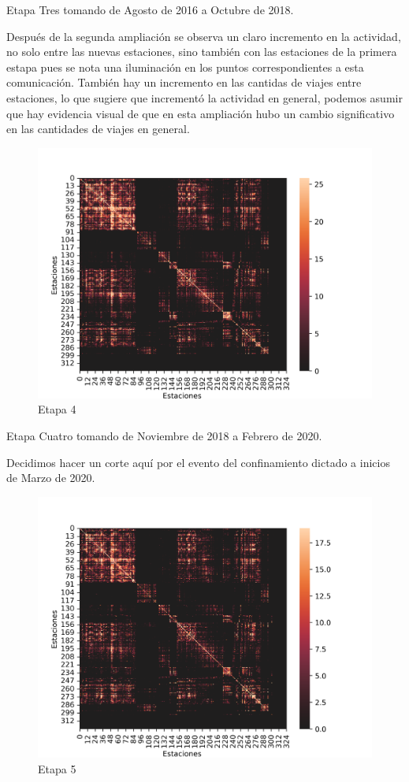 \documentclass[
]{article}
\begin{document}
Etapa Tres tomando de Agosto de 2016 a Octubre de 2018.

Después de la segunda ampliación se observa un claro incremento en la
actividad, no solo entre las nuevas estaciones, sino también con las
estaciones de la primera estapa pues se nota una iluminación en los
puntos correspondientes a esta comunicación. También hay un incremento
en las cantidas de viajes entre estaciones, lo que sugiere que
incrementó la actividad en general, podemos asumir que hay evidencia
visual de que en esta ampliación hubo un cambio significativo en las
cantidades de viajes en general.

\begin{figure}
\centering
\includegraphics{../plots/resultsCuatro.png}
\caption{Etapa 4}
\end{figure}

Etapa Cuatro tomando de Noviembre de 2018 a Febrero de 2020.

Decidimos hacer un corte aquí por el evento del confinamiento dictado a
inicios de Marzo de 2020.

\begin{figure}
\centering
\includegraphics{../plots/resultsCinco.png}
\caption{Etapa 5}
\end{figure}
\end{document}
